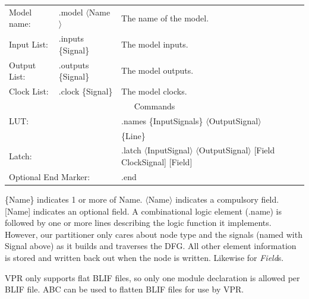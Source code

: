 \documentclass[12pt,final,oneside]{dwThesis} %
\begin{document}
   \begin{tabular}{lll} Model name: & .model $\langle$Name$\rangle$ & The name
      of the model.\\ Input List: & .inputs \{Signal\} & The model inputs.\\
      Output List:& .outputs \{Signal\} & The model outputs.\\ Clock List: &
      .clock \{Signal\} & The model clocks.\\ \multicolumn{3}{c}{Commands}\\
      \multicolumn{2}{l}{\gls{LUT}:} & .names \{InputSignals\}
      $\langle$OutputSignal$\rangle$\\ &&\{Line\}\\ \multicolumn{2}{l}{Latch:}
      & .latch $\langle$InputSignal$\rangle$ $\langle$OutputSignal$\rangle$
      [Field ClockSignal] [Field]\\ \multicolumn{2}{l}{Optional End Marker:} &
      .end \end{tabular}

   \{Name\} indicates 1 or more of Name. $\langle$Name$\rangle$ indicates a
   compulsory field. [Name] indicates an optional field.  A combinational logic
   element (.name) is followed by one or more lines describing the logic
   function it implements. However, our partitioner only cares about node type
   and the signals (named with Signal above) as it builds and traverses the
   \gls{DFG}. All other element information is stored and written back out when
   the node is written. Likewise for \textit{Field}s.

   \gls{VPR} only supports flat \gls{BLIF} files, so only one module
   declaration is allowed per \gls{BLIF} file. \gls{ABC} can be used to flatten
   \gls{BLIF} files for use by \gls{VPR}.
\end{document}

